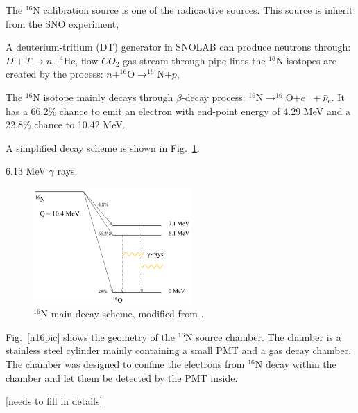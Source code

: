The $^{16}$N calibration source is one of the radioactive sources. This source is inherit from the SNO experiment\cite{dragowsky1999sudbury,dragowsky200216n,hamer2001energy}, 

A deuterium-tritium (DT) generator in SNOLAB can produce neutrons through: $D+T\to n+^{4}$He, 
flow $CO_2$ gas stream through pipe lines
the $^{16}$N isotopes are created by the process: $n+^{16}$O$\to^{16}$N$+p$,

The $^{16}$N isotope mainly decays through $\beta$-decay process: $^{16}$N$\to ^{16}$O$+e^-+\bar{\nu}_e$.
It has a 66.2\% chance to emit an electron with end-point energy of 4.29 MeV and a 22.8\% chance to 
10.42 MeV\cite{nndc}.

A simplified decay scheme is shown in Fig.~\ref{n16decay}.

6.13 MeV $\gamma$ rays.
\begin{figure}[!htb]
	\centering
	\includegraphics[width=6cm]{n16_decay.png}
	\caption{$^{16}$N main decay scheme, modified from \cite{dragowsky200216n}.}
	\label{n16decay}
\end{figure}


Fig.~\ref{n16pic} shows the geometry of the $^{16}$N source chamber. The chamber is a stainless steel cylinder mainly containing a small PMT and a gas decay chamber. The chamber was designed to confine the electrons from $^{16}$N decay within the chamber and let them be detected by the PMT inside\cite{dragowsky1999sudbury}.

[needs to fill in details]








